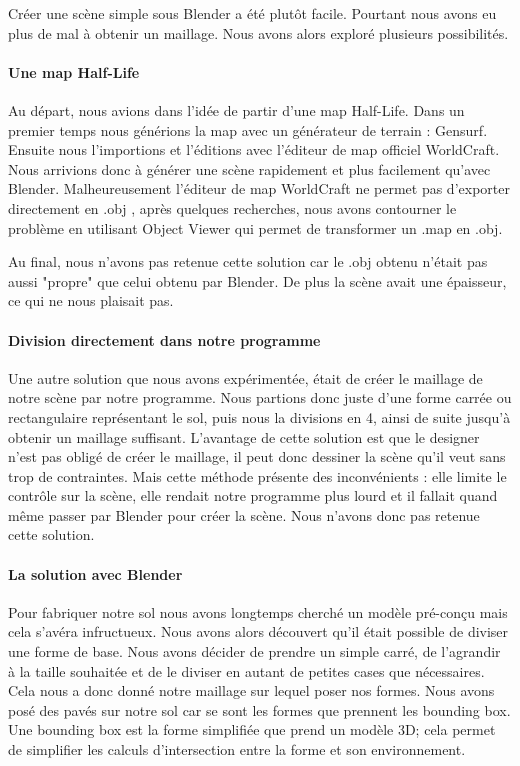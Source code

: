 \documentclass[a4paper,12pt]{report}
\begin{document}
Créer une scène simple sous Blender a été plutôt facile. Pourtant nous avons eu plus de mal à obtenir un maillage. Nous avons alors exploré plusieurs possibilités.

\paragraph{Une map Half-Life}

Au départ, nous avions dans l'idée de partir d'une map Half-Life. Dans un premier temps nous générions la map avec un générateur de terrain : Gensurf. Ensuite nous l'importions et l'éditions avec l'éditeur de map officiel WorldCraft. Nous arrivions donc à générer une scène rapidement et plus facilement qu'avec Blender. 
Malheureusement l'éditeur de map WorldCraft ne permet pas d'exporter directement en .obj , après quelques recherches, nous avons contourner le problème en utilisant Object Viewer qui permet de transformer un .map en .obj.

Au final, nous n'avons pas retenue cette solution car le .obj obtenu n'était pas aussi "propre" que celui obtenu par Blender. De plus la scène avait une épaisseur, ce qui ne nous plaisait pas.

\paragraph{Division directement dans notre programme}

Une autre solution que nous avons expérimentée, était de créer le maillage de notre scène par notre programme. Nous partions donc juste d'une forme carrée ou rectangulaire représentant le sol, puis nous la divisions en 4, ainsi de suite jusqu'à obtenir un maillage suffisant.
L'avantage de cette solution est que le designer n'est pas obligé de créer le maillage, il peut donc dessiner la scène qu'il veut sans trop de contraintes. Mais cette méthode présente des inconvénients : elle limite le contrôle sur la scène, elle rendait notre programme plus lourd et il fallait quand même passer par Blender pour créer la scène. Nous n'avons donc pas retenue cette solution.

\paragraph{La solution avec Blender}

Pour fabriquer notre sol nous avons longtemps cherché un modèle pré-conçu mais cela s'avéra infructueux.
Nous avons alors découvert qu'il était possible de diviser une forme de base. Nous avons décider de prendre un simple carré, de l'agrandir à la taille souhaitée et de le diviser en autant de petites cases que nécessaires. Cela nous a donc donné notre maillage sur lequel poser nos formes.
Nous avons posé des pavés sur notre sol car se sont les formes que prennent les bounding box. Une bounding box est la forme simplifiée que prend un modèle 3D; cela permet de simplifier les calculs d'intersection entre la forme et son environnement.
\end{document}
